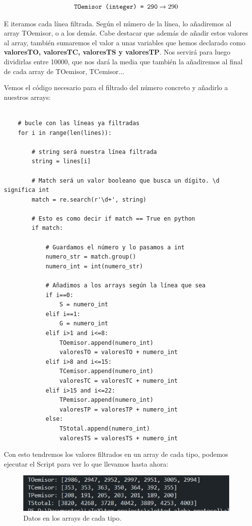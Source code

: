 \documentclass{article}
\begin{document}
$$\verb|TOemisor (integer) = 290| \rightarrow 290$$

E iteramos cada línea filtrada. Según el número de la línea, lo añadiremos al array TOemisor, o a los demás. Cabe destacar que además de añadir estos valores al array, también sumaremos el valor a unas variables que hemos declarado como \textbf{valoresTO, valoresTC, valoresTS y valoresTP}. Nos servirá para luego dividirlas entre 10000, que nos dará la media que también la añadiremos al final de cada array de TOemisor, TCemisor... 

Vemos el código necesario para el filtrado del número concreto y añadirlo a nuestros arrays:

\quad 

\begin{center} 
    \begin{verbatim}

    # bucle con las líneas ya filtradas
    for i in range(len(lines)):

        # string será nuestra línea filtrada
        string = lines[i]

        # Match será un valor booleano que busca un dígito. \d significa int
        match = re.search(r'\d+', string)

        # Esto es como decir if match == True en python
        if match:

            # Guardamos el número y lo pasamos a int
            numero_str = match.group()
            numero_int = int(numero_str)

            # Añadimos a los arrays según la línea que sea
            if i==0:
                S = numero_int
            elif i==1:
                G = numero_int
            elif i>1 and i<=8:
                TOemisor.append(numero_int)
                valoresTO = valoresTO + numero_int
            elif i>8 and i<=15:
                TCemisor.append(numero_int)
                valoresTC = valoresTC + numero_int
            elif i>15 and i<=22:
                TPemisor.append(numero_int)
                valoresTP = valoresTP + numero_int
            else:
                TStotal.append(numero_int)
                valoresTS = valoresTS + numero_int
    \end{verbatim}
    \end{center} 
\quad

Con esto tendremos los valores filtrados en un array de cada tipo, podemos ejecutar el Script para ver lo que llevamos hasta ahora:

\begin{figure}[h]
    \centering
    \includegraphics[width=0.7\linewidth]{src/lineas filtradas2.png}
    \caption{\label{fig:filtradas2} Datos en los arrays de cada tipo.}
\end{figure}
\end{document}
